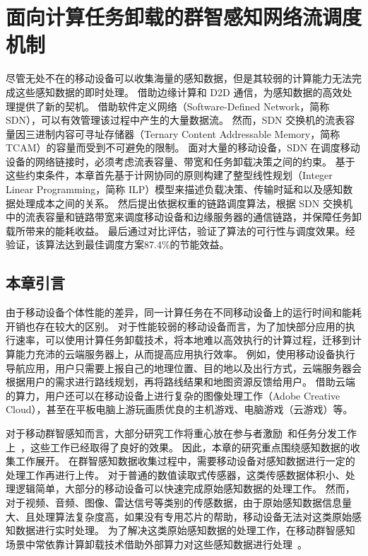 \chapter{面向计算任务卸载的群智感知网络流调度机制}

尽管无处不在的移动设备可以收集海量的感知数据，但是其较弱的计算能力无法完成这些感知数据的即时处理。
借助边缘计算和 D2D 通信，为感知数据的高效处理提供了新的契机。
借助软件定义网络（Software-Defined Network，简称SDN），可以有效管理该过程中产生的大量数据流。
然而，SDN 交换机的流表容量因三进制内容可寻址存储器（Ternary Content Addressable Memory，简称 TCAM）的容量而受到不可避免的限制。
面对大量的移动设备，SDN 在调度移动设备的网络链接时，必须考虑流表容量、带宽和任务卸载决策之间的约束。
基于这些约束条件，本章首先基于计网协同的原则构建了整型线性规划（Integer Linear Programming，简称 ILP）模型来描述负载决策、传输时延和以及感知数据处理成本之间的关系。
然后提出依据权重的链路调度算法，根据 SDN 交换机中的流表容量和链路带宽来调度移动设备和边缘服务器的通信链路，并保障任务卸载所带来的能耗收益。
最后通过对比评估，验证了算法的可行性与调度效果。经验证，该算法达到最佳调度方案87.4\%的节能效益。

\section{本章引言}

由于移动设备个体性能的差异，同一计算任务在不同移动设备上的运行时间和能耗开销也存在较大的区别。
对于性能较弱的移动设备而言，为了加快部分应用的执行速率，可以使用计算任务卸载技术，将本地难以高效执行的计算过程，迁移到计算能力充沛的云端服务器上，从而提高应用执行效率。
例如，使用移动设备执行导航应用，用户只需要上报自己的地理位置、目的地以及出行方式，云端服务器会根据用户的需求进行路线规划，再将路线结果和地图资源反馈给用户。
借助云端的算力，用户还可以在移动设备上进行复杂的图像处理工作（Adobe Creative Cloud），甚至在平板电脑上游玩画质优良的主机游戏、电脑游戏（云游戏）等。

对于移动群智感知而言，大部分研究工作将重心放在参与者激励~\cite{CNKI:JiaChaopeng, DBLP:journals/comsur/ZhangYSLTXM16, CNKI:WuMCSIncentive}和任务分发工作上~\cite{DBLP:conf/huc/LiuGWWYZ16, DBLP:conf/infocom/Xiao0HWL15, DBLP:conf/mass/LiLW15}，这些工作已经取得了良好的效果。
因此，本章的研究重点围绕感知数据的收集工作展开。
在群智感知数据收集过程中，需要移动设备对感知数据进行一定的处理工作再进行上传。
对于普通的数值读取式传感器，这类传感数据体积小、处理逻辑简单，大部分的移动设备可以快速完成原始感知数据的处理工作。
然而，对于视频、音频、图像、雷达信号等类别的传感数据，由于原始感知数据信息量大、且处理算法复杂度高，如果没有专用芯片的帮助，移动设备无法对这类原始感知数据进行实时处理。
为了解决这类原始感知数据的处理工作，在移动群智感知场景中常依靠计算卸载技术借助外部算力对这些感知数据进行处理~\cite{Lee:2013fj, Linthicum:2017vv, Kumar:2013dq}。

